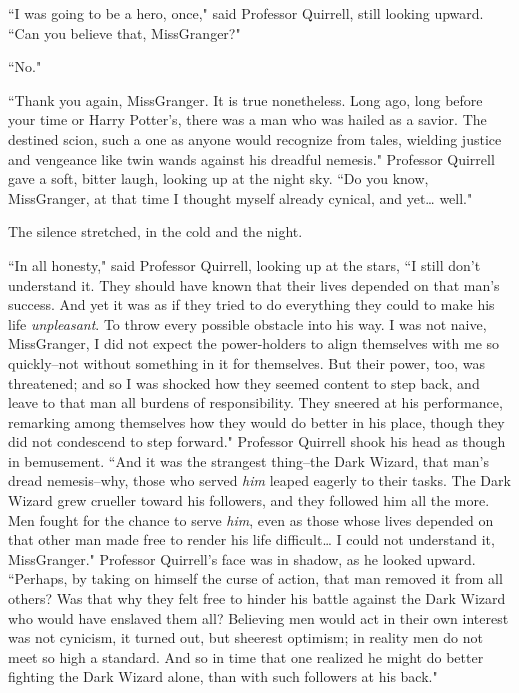 ``I was going to be a hero, once," said Professor Quirrell, still looking upward. ``Can you believe that, Miss\?Granger?"

``No."

``Thank you again, Miss\?Granger. It is true nonetheless. Long ago, long before your time or Harry Potter's, there was a man who was hailed as a savior. The destined scion, such a one as anyone would recognize from tales, wielding justice and vengeance like twin wands against his dreadful nemesis." Professor Quirrell gave a soft, bitter laugh, looking up at the night sky. ``Do you know, Miss\?Granger, at that time I thought myself already cynical, and yet{\ldots} well."

The silence stretched, in the cold and the night.

``In all honesty," said Professor Quirrell, looking up at the stars, ``I still don't understand it. They should have known that their lives depended on that man's success. And yet it was as if they tried to do everything they could to make his life \emph{unpleasant}. To throw every possible obstacle into his way. I was not naive, Miss\?Granger, I did not expect the power-holders to align themselves with me so quickly\---not without something in it for themselves. But their power, too, was threatened; and so I was shocked how they seemed content to step back, and leave to that man all burdens of responsibility. They sneered at his performance, remarking among themselves how they would do better in his place, though they did not condescend to step forward." Professor Quirrell shook his head as though in bemusement. ``And it was the strangest thing\---the Dark Wizard, that man's dread nemesis\---why, those who served \emph{him} leaped eagerly to their tasks. The Dark Wizard grew crueller toward his followers, and they followed him all the more. Men fought for the chance to serve \emph{him}, even as those whose lives depended on that other man made free to render his life difficult{\ldots} I could not understand it, Miss\?Granger." Professor Quirrell's face was in shadow, as he looked upward. ``Perhaps, by taking on himself the curse of action, that man removed it from all others? Was that why they felt free to hinder his battle against the Dark Wizard who would have enslaved them all? Believing men would act in their own interest was not cynicism, it turned out, but sheerest optimism; in reality men do not meet so high a standard. And so in time that one realized he might do better fighting the Dark Wizard alone, than with such followers at his back."

